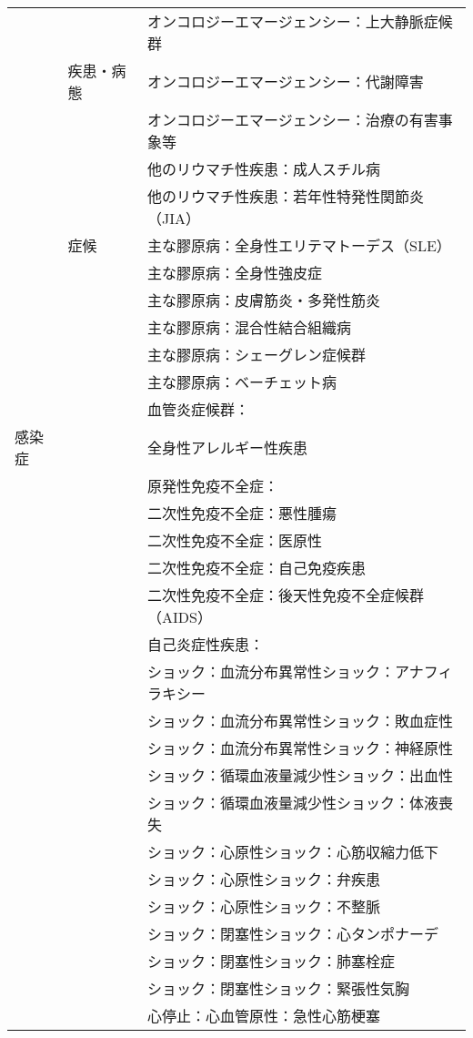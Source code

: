 \begin{xltabular}{\linewidth}{XXX}
 &  & オンコロジーエマージェンシー：上大静脈症候群 \\
 & 疾患・病態 & オンコロジーエマージェンシー：代謝障害 \\
 &  & オンコロジーエマージェンシー：治療の有害事象等 \\
 &  & 他のリウマチ性疾患：成人スチル病 \\
 &  & 他のリウマチ性疾患：若年性特発性関節炎（JIA） \\
 & 症候 & 主な膠原病：全身性エリテマトーデス（SLE） \\
 &  & 主な膠原病：全身性強皮症 \\
 &  & 主な膠原病：皮膚筋炎・多発性筋炎 \\
 &  & 主な膠原病：混合性結合組織病 \\
 &  & 主な膠原病：シェーグレン症候群 \\
 &  & 主な膠原病：ベーチェット病 \\
 &  & 血管炎症候群： \\
感染症 &  & 全身性アレルギー性疾患 \\
 &  & 原発性免疫不全症： \\
 &  & 二次性免疫不全症：悪性腫瘍 \\
 &  & 二次性免疫不全症：医原性 \\
 &  & 二次性免疫不全症：自己免疫疾患 \\
 &  & 二次性免疫不全症：後天性免疫不全症候群（AIDS） \\
 &  & 自己炎症性疾患： \\
 &  & ショック：血流分布異常性ショック：アナフィラキシー \\
 &  & ショック：血流分布異常性ショック：敗血症性 \\
 &  & ショック：血流分布異常性ショック：神経原性 \\
 &  & ショック：循環血液量減少性ショック：出血性 \\
 &  & ショック：循環血液量減少性ショック：体液喪失 \\
 &  & ショック：心原性ショック：心筋収縮力低下 \\
 &  & ショック：心原性ショック：弁疾患 \\
 &  & ショック：心原性ショック：不整脈 \\
 &  & ショック：閉塞性ショック：心タンポナーデ \\
 &  & ショック：閉塞性ショック：肺塞栓症 \\
 &  & ショック：閉塞性ショック：緊張性気胸 \\
 &  & 心停止：心血管原性：急性心筋梗塞 \\

\end{xltabular}
